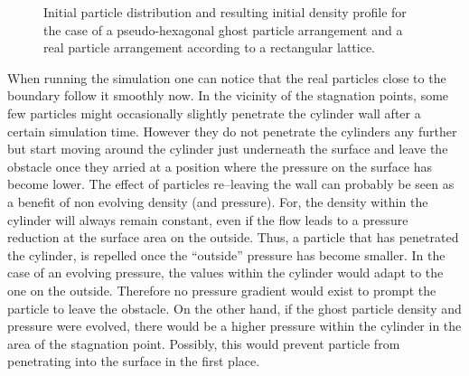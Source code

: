 \documentclass{report}
\begin{document}
\begin{figure}[h]
\centering
\label{fig:PorosResultsCylinder_prtlDiscontinuity_reglatice_pseudoHex}

\caption[Initial situation for cylinder porosities]{Initial particle distribution   and resulting initial density profile  for the case of a pseudo-hexagonal ghost particle arrangement and a real particle arrangement according to a rectangular lattice.}
\end{figure}


When running the simulation one can notice that the real particles close to the boundary follow it smoothly now. In the vicinity of the stagnation points, some few particles might occasionally slightly penetrate the cylinder wall after a certain simulation time. However they do not penetrate the cylinders any further but start moving around the cylinder just underneath the surface and leave the obstacle once they arried at a position where the pressure on the surface has become lower.
The effect of particles re--leaving the wall can probably be seen as a benefit of non evolving density (and pressure). For, the density within the cylinder will always remain constant, even if the flow leads to a pressure reduction at the surface area on the outside. Thus, a particle that has penetrated the cylinder, is repelled once the ``outside'' pressure has become smaller. In the case of an evolving pressure, the values within the cylinder would adapt to the one on the outside. Therefore no pressure gradient would exist to prompt the particle to leave the obstacle. 
On the other hand, if the ghost particle density and pressure were evolved, there would be a higher pressure within the cylinder in the area of the stagnation point. Possibly, this would prevent particle from penetrating into the surface in the first place.
\end{document}
